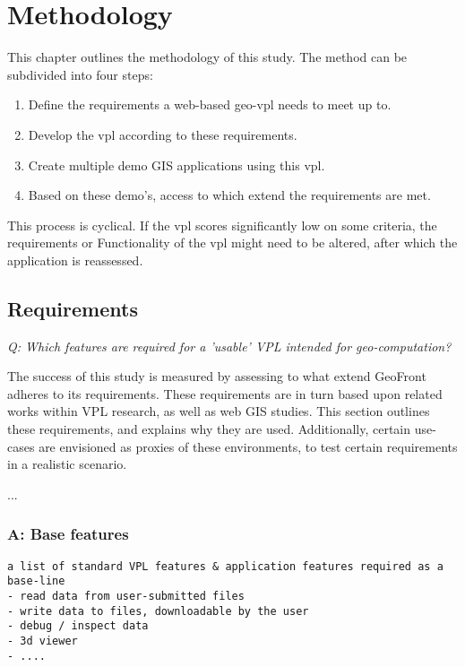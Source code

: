 \chapter{Methodology}
This chapter outlines the methodology of this study. 
The method can be subdivided into four steps:

\begin{enumerate}[(1)]
  \item Define the requirements a web-based geo-vpl needs to meet up to.
  \item Develop the vpl according to these requirements.
  \item Create multiple demo GIS applications using this vpl.
  \item Based on these demo's, access to which extend the requirements are met.  
\end{enumerate}

This process is cyclical.
If the vpl scores significantly low on some criteria, the requirements or Functionality of the vpl might need to be altered, after which the application is reassessed. 


\section{Requirements}

\emph{Q: Which features are required for a 'usable' VPL intended for geo-computation?}


The success of this study is measured by assessing to what extend GeoFront adheres to its requirements. 
These requirements are in turn based upon related works within VPL research, as well as web GIS studies. 
This section outlines these requirements, and explains why they are used. 
Additionally, certain use-cases are envisioned as proxies of these environments, to test certain requirements in a realistic scenario. 

...

\subsection*{A: Base features}
\begin{lstlisting}
a list of standard VPL features & application features required as a base-line
- read data from user-submitted files
- write data to files, downloadable by the user  
- debug / inspect data
- 3d viewer 
- ....
\end{lstlisting}


